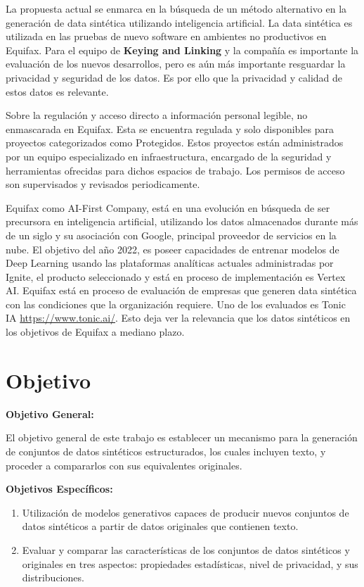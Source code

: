 La propuesta actual se enmarca en la búsqueda de un método alternativo en la generación de data sintética utilizando inteligencia artificial. La data sintética es utilizada en las pruebas de nuevo software en ambientes no productivos en Equifax. Para el equipo de \textbf{Keying and Linking} y la compañía es importante la evaluación de los nuevos desarrollos, pero es aún más importante resguardar la privacidad y seguridad de los datos. Es por ello que la privacidad y calidad de estos datos es relevante.

Sobre la regulación y acceso directo a información personal legible, no enmascarada en Equifax. Esta se encuentra regulada y solo disponibles para proyectos categorizados como Protegidos. Estos proyectos están administrados por un equipo especializado en infraestructura, encargado de la seguridad y herramientas ofrecidas para dichos espacios de trabajo. Los permisos de acceso son supervisados y revisados periodicamente.

Equifax como AI-First Company, está en una evolución en búsqueda de ser precursora en inteligencia artificial, utilizando los datos almacenados durante más de un siglo y su asociación con Google, principal proveedor de servicios en la nube. El objetivo del año 2022, es poseer capacidades de entrenar modelos de Deep Learning usando las plataformas analíticas actuales administradas por Ignite, el producto seleccionado y está en proceso de implementación es Vertex AI. Equifax está en proceso de evaluación de empresas que generen data sintética con las condiciones que la organización requiere. Uno de los evaluados es Tonic IA \url{https://www.tonic.ai/}. Esto deja ver la relevancia que los datos sintéticos en los objetivos de Equifax a mediano plazo.

\section{Objetivo}

\textbf{Objetivo General:}

El objetivo general de este trabajo es establecer un mecanismo para la generación de conjuntos de datos sintéticos estructurados, los cuales incluyen texto, y proceder a compararlos con sus equivalentes originales.

\textbf{Objetivos Específicos:}
\begin{enumerate}
    \item Utilización de modelos generativos capaces de producir nuevos conjuntos de datos sintéticos a partir de datos originales que contienen texto.
    \item Evaluar y comparar las características de los conjuntos de datos sintéticos y originales en tres aspectos: propiedades estadísticas, nivel de privacidad, y sus distribuciones.
\end{enumerate}

